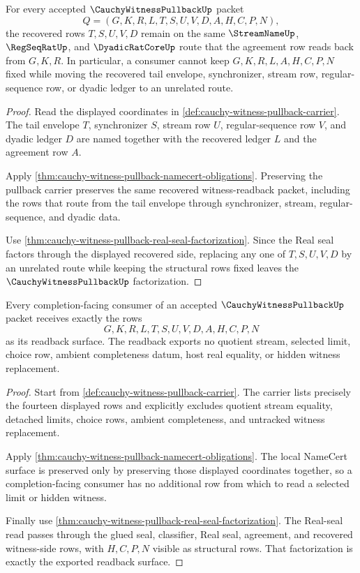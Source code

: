 \begin{theorem}
\label{thm:cauchy-witness-pullback-tail-synchronizer-compatibility}
For every accepted $\CauchyWitnessPullbackUp$ packet
$$
Q=(G,K,R,L,T,S,U,V,D,A,H,C,P,N),
$$
the recovered rows $T,S,U,V,D$ remain on the same $\StreamNameUp$, $\RegSeqRatUp$, and $\DyadicRatCoreUp$ route that the agreement row reads back from $G,K,R$. In particular, a consumer cannot keep $G,K,R,L,A,H,C,P,N$ fixed while moving the recovered tail envelope, synchronizer, stream row, regular-sequence row, or dyadic ledger to an unrelated route.
\end{theorem}
\begin{proof}
Read the displayed coordinates in \autoref{def:cauchy-witness-pullback-carrier}. The tail envelope $T$, synchronizer $S$, stream row $U$, regular-sequence row $V$, and dyadic ledger $D$ are named together with the recovered ledger $L$ and the agreement row $A$.

Apply \autoref{thm:cauchy-witness-pullback-namecert-obligations}. Preserving the pullback carrier preserves the same recovered witness-readback packet, including the rows that route from the tail envelope through synchronizer, stream, regular-sequence, and dyadic data.

Use \autoref{thm:cauchy-witness-pullback-real-seal-factorization}. Since the Real seal factors through the displayed recovered side, replacing any one of $T,S,U,V,D$ by an unrelated route while keeping the structural rows fixed leaves the $\CauchyWitnessPullbackUp$ factorization.
\end{proof}

\begin{theorem}
\label{thm:cauchy-witness-pullback-real-seal-readback-exactness}
Every completion-facing consumer of an accepted $\CauchyWitnessPullbackUp$ packet receives exactly the rows
$$
G,K,R,L,T,S,U,V,D,A,H,C,P,N
$$
as its readback surface. The readback exports no quotient stream, selected limit, choice row, ambient completeness datum, host real equality, or hidden witness replacement.
\end{theorem}
\begin{proof}
Start from \autoref{def:cauchy-witness-pullback-carrier}. The carrier lists precisely the fourteen displayed rows and explicitly excludes quotient stream equality, detached limits, choice rows, ambient completeness, and untracked witness replacement.

Apply \autoref{thm:cauchy-witness-pullback-namecert-obligations}. The local NameCert surface is preserved only by preserving those displayed coordinates together, so a completion-facing consumer has no additional row from which to read a selected limit or hidden witness.

Finally use \autoref{thm:cauchy-witness-pullback-real-seal-factorization}. The Real-seal read passes through the glued seal, classifier, Real seal, agreement, and recovered witness-side rows, with $H,C,P,N$ visible as structural rows. That factorization is exactly the exported readback surface.
\end{proof}

